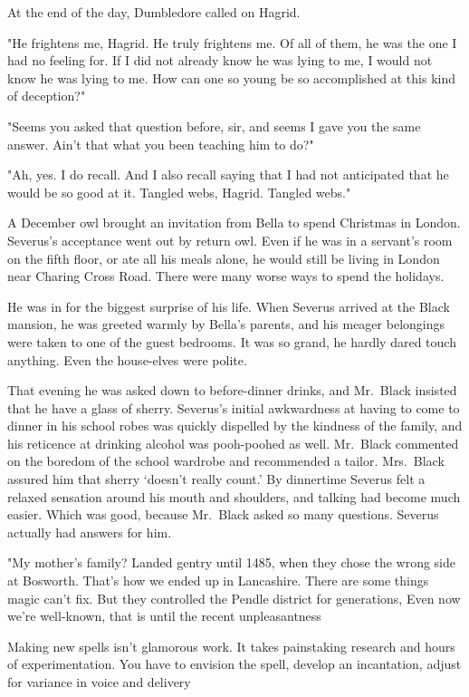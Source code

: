 At the end of the day, Dumbledore called on Hagrid.

"He frightens me, Hagrid. He truly frightens me. Of all of them, he was the one I had no feeling for. If I did not already know he was lying to me, I would not know he was lying to me. How can one so young be so accomplished at this kind of deception?"

"Seems you asked that question before, sir, and seems I gave you the same answer. Ain't that what you been teaching him to do?"

"Ah, yes. I do recall. And I also recall saying that I had not anticipated that he would be so good at it. Tangled webs, Hagrid. Tangled webs."

A December owl brought an invitation from Bella to spend Christmas in London. Severus's acceptance went out by return owl. Even if he was in a servant's room on the fifth floor, or ate all his meals alone, he would still be living in London near Charing Cross Road. There were many worse ways to spend the holidays.

He was in for the biggest surprise of his life. When Severus arrived at the Black mansion, he was greeted warmly by Bella's parents, and his meager belongings were taken to one of the guest bedrooms. It was so grand, he hardly dared touch anything. Even the house-elves were polite.

That evening he was asked down to before-dinner drinks, and Mr.~Black insisted that he have a glass of sherry. Severus's initial awkwardness at having to come to dinner in his school robes was quickly dispelled by the kindness of the family, and his reticence at drinking alcohol was pooh-poohed as well. Mr.~Black commented on the boredom of the school wardrobe and recommended a tailor. Mrs.~Black assured him that sherry `doesn't really count.' By dinnertime Severus felt a relaxed sensation around his mouth and shoulders, and talking had become much easier. Which was good, because Mr.~Black asked so many questions. Severus actually had answers for him.

"My mother's family? Landed gentry until 1485, when they chose the wrong side at Bosworth. That's how we ended up in Lancashire. There are some things magic can't fix. But they controlled the Pendle district for generations, Even now we're well-known, that is until the recent{\el} unpleasantness{\el}

\textooquote Making new spells isn't glamorous work. It takes painstaking research and hours of experimentation. You have to envision the spell, develop an incantation, adjust for variance in voice and delivery{\el}


